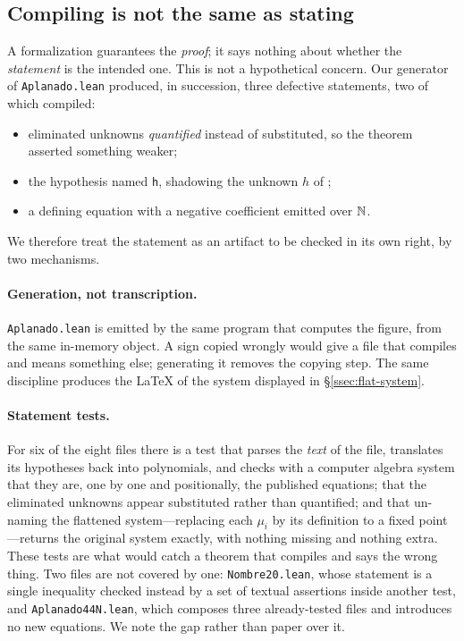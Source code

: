\subsection{Compiling is not the same as stating}

A formalization guarantees the \emph{proof}; it says nothing about whether the
\emph{statement} is the intended one. This is not a hypothetical concern. Our
generator of \texttt{Aplanado.lean} produced, in succession, three defective
statements, two of which compiled:

\begin{itemize}[nosep]
  \item eliminated unknowns \emph{quantified} instead of substituted, so the
        theorem asserted something weaker;
  \item the hypothesis named \texttt{h}, shadowing the unknown $h$ of
        \cite{jsww1976};
  \item a defining equation with a negative coefficient emitted over $\mathbb{N}$.
\end{itemize}

We therefore treat the statement as an artifact to be checked in its own right,
by two mechanisms.

\paragraph{Generation, not transcription.}
\texttt{Aplanado.lean} is emitted by the same program that computes the figure,
from the same in-memory object. A sign copied wrongly would give a file that
compiles and means something else; generating it removes the copying step. The
same discipline produces the \LaTeX{} of the system displayed in
\S\ref{ssec:flat-system}.

\paragraph{Statement tests.}
For six of the eight files there is a test that parses the \emph{text} of the file,
translates its hypotheses back into polynomials, and checks with a computer
algebra system that they are, one by one and positionally, the published
equations; that the eliminated unknowns appear substituted rather than
quantified; and that un-naming the flattened system---replacing each $\mu_i$ by
its definition to a fixed point---returns the original system exactly, with
nothing missing and nothing extra. These tests are what would catch a theorem
that compiles and says the wrong thing. Two files are not covered by one:
\texttt{Nombre20.lean}, whose statement is a single inequality checked instead
by a set of textual assertions inside another test, and \texttt{Aplanado44N.lean},
which composes three already-tested files and introduces no new equations. We
note the gap rather than paper over it.

